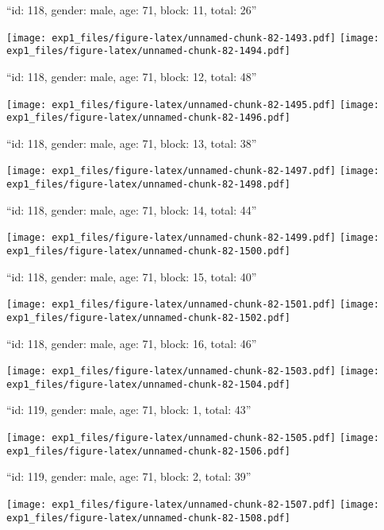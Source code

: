 \documentclass[11pt,,]{article}
\begin{document}
\newpage
[1] 

``id: 118, gender: male, age: 71, block: 11, total: 26''

\texttt{[image: exp1\_files/figure-latex/unnamed-chunk-82-1493.pdf]}
\texttt{[image: exp1\_files/figure-latex/unnamed-chunk-82-1494.pdf]}

\newpage
[1] 

``id: 118, gender: male, age: 71, block: 12, total: 48''

\texttt{[image: exp1\_files/figure-latex/unnamed-chunk-82-1495.pdf]}
\texttt{[image: exp1\_files/figure-latex/unnamed-chunk-82-1496.pdf]}

\newpage
[1] 

``id: 118, gender: male, age: 71, block: 13, total: 38''

\texttt{[image: exp1\_files/figure-latex/unnamed-chunk-82-1497.pdf]}
\texttt{[image: exp1\_files/figure-latex/unnamed-chunk-82-1498.pdf]}

\newpage
[1] 

``id: 118, gender: male, age: 71, block: 14, total: 44''

\texttt{[image: exp1\_files/figure-latex/unnamed-chunk-82-1499.pdf]}
\texttt{[image: exp1\_files/figure-latex/unnamed-chunk-82-1500.pdf]}

\newpage
[1] 

``id: 118, gender: male, age: 71, block: 15, total: 40''

\texttt{[image: exp1\_files/figure-latex/unnamed-chunk-82-1501.pdf]}
\texttt{[image: exp1\_files/figure-latex/unnamed-chunk-82-1502.pdf]}

\newpage
[1] 

``id: 118, gender: male, age: 71, block: 16, total: 46''

\texttt{[image: exp1\_files/figure-latex/unnamed-chunk-82-1503.pdf]}
\texttt{[image: exp1\_files/figure-latex/unnamed-chunk-82-1504.pdf]}

\newpage
[1] 

``id: 119, gender: male, age: 71, block: 1, total: 43''

\texttt{[image: exp1\_files/figure-latex/unnamed-chunk-82-1505.pdf]}
\texttt{[image: exp1\_files/figure-latex/unnamed-chunk-82-1506.pdf]}

\newpage
[1] 

``id: 119, gender: male, age: 71, block: 2, total: 39''

\texttt{[image: exp1\_files/figure-latex/unnamed-chunk-82-1507.pdf]}
\texttt{[image: exp1\_files/figure-latex/unnamed-chunk-82-1508.pdf]}
\end{document}
